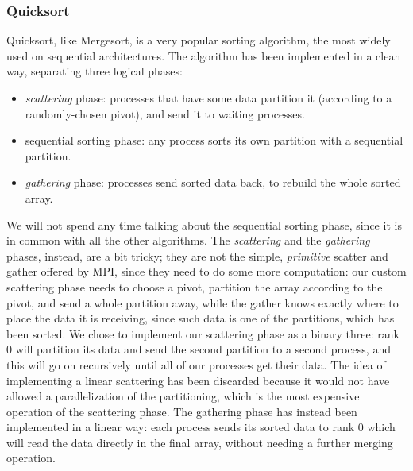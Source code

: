 \subsubsection{Quicksort}
Quicksort, like Mergesort, is a very popular sorting algorithm, the most widely used on sequential architectures. The algorithm has been implemented in a clean way, separating three logical phases:
\begin{itemize}
	\item{\textit{scattering} phase: processes that have some data partition it (according to a randomly-chosen pivot), and send it to waiting processes.}
	\item{sequential sorting phase: any process sorts its own partition with a sequential partition.}
	\item{\textit{gathering} phase: processes send sorted data back, to rebuild the whole sorted array.}
\end{itemize}
We will not spend any time talking about the sequential sorting phase, since it is in common with all the other algorithms.
The \textit{scattering} and the \textit{gathering} phases, instead, are a bit tricky; they are not the simple, \textit{primitive} scatter and gather offered by MPI, since they need to do some more computation: our custom scattering phase needs to choose a pivot, partition the array according to the pivot, and send a whole partition away, while the gather knows exactly where to place the data it is receiving, since such data is one of the partitions, which has been sorted.
We chose to implement our scattering phase as a binary three: rank 0 will partition its data and send the second partition to a second process, and this will go on recursively until all of our processes get their data. The idea of implementing a linear scattering has been discarded because it would not have allowed a parallelization of the partitioning, which is the most expensive operation of the scattering phase.
The gathering phase has instead been implemented in a linear way: each process sends its sorted data to rank 0 which will read the data directly in the final array, without needing a further merging operation.
